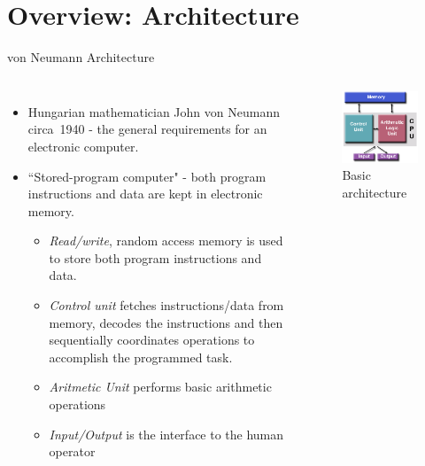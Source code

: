 \documentclass[10pt,times]{beamer}
\subtitle{Accelerating numerical codes}
\begin{document}
\begin{frame}
  \titlepage
\end{frame}

\section{Overview: Architecture}

\begin{frame}{von Neumann Architecture}
\begin{columns}
\begin{itemize}
\item Hungarian mathematician John von Neumann circa~1940 - the general 
requirements 
for an electronic computer.
\item ``Stored-program computer" - both program instructions and data are 
kept in 
electronic memory.
\begin{itemize}
\item \textit{Read/write}, random access memory is used to store both 
program 
instructions and data.

\item \textit{Control unit} fetches instructions/data from memory, decodes 
the 
instructions and then sequentially coordinates operations to accomplish the 
programmed task.

\item \textit{Aritmetic Unit} performs basic arithmetic operations

\item \textit{Input/Output} is the interface to the human operator 
\end{itemize}

\end{itemize} 

\begin{figure}
\includegraphics[width=0.7\linewidth]{figs/vonNeumann}
\caption*{Basic architecture}
\end{figure}
\end{columns}
\end{frame}
\end{document}
